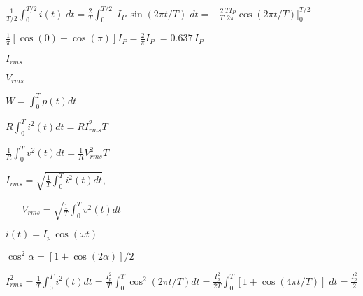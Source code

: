 \documentclass{article}
\def\lthtmlcheckvsize{\ifdim\ht\sizebox<\vsize 
  \ifdim\wd\sizebox<\hsize\expandafter\hfill\fi \expandafter\vfill
  \else\expandafter\vss\fi}%
\begin{document}
{\newpage\clearpage
{}%
$\displaystyle \frac{1}{T/2}\int_0^{T/2} i(t)\; dt
=\frac{2}{T}\int_0^{T/2} \;I_P\,\sin(2\pi t/T)\;dt
=-\frac{2}{T}\frac{TI_P}{2\pi} \cos(2\pi t/T)\bigg|_0^{T/2}$%
\lthtmlindisplaymathZ
\lthtmlcheckvsize\clearpage}

{\newpage\clearpage
{}%
$\displaystyle \frac{1}{\pi}\left[\cos(0)-\cos(\pi)\right]I_P
=\frac{2}{\pi}I_P\;=0.637\,I_P$%
\lthtmlindisplaymathZ
\lthtmlcheckvsize\clearpage}

{\newpage\clearpage
{}%
$ I_{rms}$%
\lthtmlindisplaymathZ
\lthtmlcheckvsize\clearpage}

{\newpage\clearpage
{}%
$ V_{rms}$%
\lthtmlindisplaymathZ
\lthtmlcheckvsize\clearpage}

{\newpage\clearpage
{}%
$\displaystyle W=\int_0^T p(t) dt$%
\lthtmlindisplaymathZ
\lthtmlcheckvsize\clearpage}

{\newpage\clearpage
{}%
$\displaystyle R\int_0^T i^2(t) dt
=R I^2_{rms}T$%
\lthtmlindisplaymathZ
\lthtmlcheckvsize\clearpage}

{\newpage\clearpage
{}%
$\displaystyle \frac{1}{R}\int_0^T v^2(t) dt=\frac{1}{R}V^2_{rms}T$%
\lthtmlindisplaymathZ
\lthtmlcheckvsize\clearpage}

{\newpage\clearpage
{}%
$\displaystyle I_{rms}=\sqrt{\frac{1}{T}\int_0^T i^2(t) dt},\;\;\;\;\;\;\;$%
\lthtmlindisplaymathZ
\lthtmlcheckvsize\clearpage}

{\newpage\clearpage
{}%
$\displaystyle \;\;\;\;\;\;
V_{rms}=\sqrt{\frac{1}{T}\int_0^T v^2(t) dt}$%
\lthtmlindisplaymathZ
\lthtmlcheckvsize\clearpage}

{\newpage\clearpage
{}%
$ i(t)=I_p\,\cos(\omega t)$%
\lthtmlindisplaymathZ
\lthtmlcheckvsize\clearpage}

{\newpage\clearpage
{}%
$ \cos^2\alpha=[1+\cos(2\alpha)]/2$%
\lthtmlindisplaymathZ
\lthtmlcheckvsize\clearpage}

{\newpage\clearpage
{}%
$\displaystyle I^2_{rms} = \frac{1}{T}\int_0^T i^2(t) dt
= \frac{I^2_p}{T}\int_0^T \cos^2(2\pi t/T) dt
= \frac{I^2_p}{2T}\int_0^T [1+\cos(4\pi t/T)]\; dt=\frac{I^2_p}{2}$%
\lthtmlindisplaymathZ
\lthtmlcheckvsize\clearpage}
\end{document}
